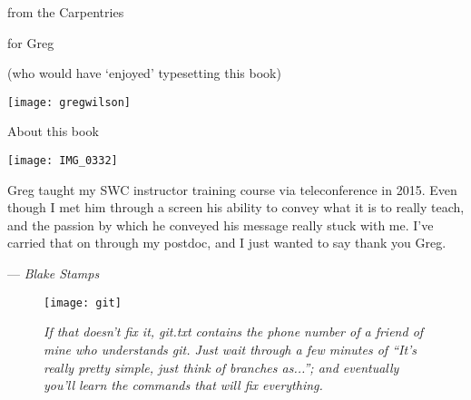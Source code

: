 %
%
% 
%
\newcommand{\signed}[1]{\par\hfill\normalfont--- \textit{#1}}

\newpage

\vspace*{1in}
\begin{center}
{\Large from the Carpentries} 

{\LARGE for Greg}

{\large (who would have `enjoyed' typesetting this book)}

\vspace*{0.5in}

\texttt{[image: gregwilson]}
\end{center}
\newpage

\vspace*{1in}
{\LARGE About this book}


\newpage
\pagestyle{plain}

\texttt{[image: IMG\_0332]}

Greg taught my SWC instructor training course via teleconference in 2015. Even
though I met him through a screen his ability to convey what it is to really
teach, and the passion by which he conveyed his message really stuck with me.
I've carried that on through my postdoc, and I just wanted to say thank you
Greg.

\signed{Blake Stamps}

\newpage

\begin{figure}[h!]
\begin{center}
\texttt{[image: git]}
\caption*{\textit{
If that doesn't fix it, git.txt contains the phone number of a friend
of mine who understands git. Just wait through a few minutes of
``It's really pretty simple, just think of branches as...''; and
eventually you'll learn the commands that will fix everything.}}
\end{center}
\end{figure}

